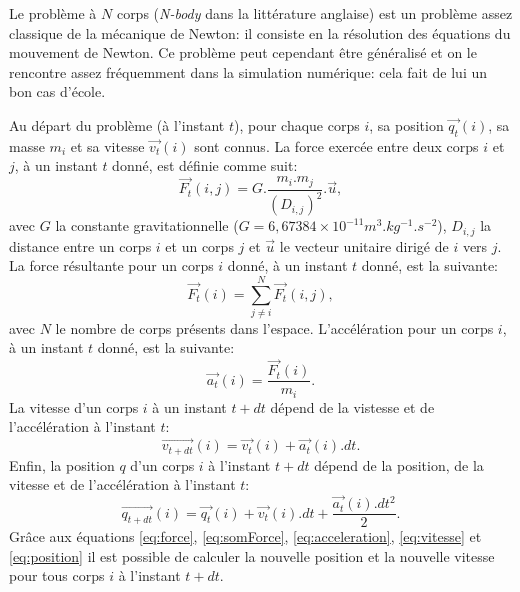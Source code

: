 Le problème à $N$ corps (\textit{N-body} dans la littérature anglaise) est un problème assez classique de la mécanique de {\sc Newton}: il consiste en la résolution des équations du mouvement de {\sc Newton}. 
Ce problème peut cependant être généralisé et on le rencontre assez fréquemment dans la simulation numérique: cela fait de lui un bon cas d'école.

Au départ du problème (à l'instant $t$), pour chaque corps $i$, sa position $\vec{q_t}(i)$, sa masse $m_i$ et sa vitesse $\vec{v_t}(i)$ sont connus.
La force exercée entre deux corps $i$ et $j$, à un instant $t$ donné, est définie comme suit:
\begin{equation}
\label{eq:force}
\vec{F_t}(i,j) = G.\frac{m_i.m_j}{(D_{i,j})^2}.\vec{u},
\end{equation}
avec $G$ la constante gravitationnelle ($G = 6,67384\times10^{-11} m^3.kg^{-1}.s^{-2}$), $D_{i,j}$ la distance entre un corps $i$ et un corps $j$ et $\vec{u}$ le vecteur unitaire dirigé de $i$ vers $j$.
La force résultante pour un corps $i$ donné, à un instant $t$ donné, est la suivante:
\begin{equation}
\label{eq:somForce}
\vec{F_t}(i) = \sum_{j \ne i}^{N} \vec{F_t}(i,j),
\end{equation}
avec $N$ le nombre de corps présents dans l'espace.
L'accélération pour un corps $i$, à un instant $t$ donné, est la suivante:
\begin{equation}
\label{eq:acceleration}
\vec{a_t}(i) = \frac{\vec{F_t}(i)}{m_i}.
\end{equation}
La vitesse d'un corps $i$ à un instant $t + dt$ dépend de la vistesse et de l'accélération à l'instant $t$:
\begin{equation}
\label{eq:vitesse}
\vec{v_{t+dt}}(i) = \vec{v_{t}}(i) + \vec{a_t}(i).dt.
\end{equation}
Enfin, la position $q$ d'un corps $i$ à l'instant $t + dt$ dépend de la position, de la vitesse et de l'accélération à l'instant $t$:
\begin{equation}
\label{eq:position}
\vec{q_{t+dt}}(i) = \vec{q_{t}}(i) + \vec{v_{t}}(i).dt + \frac{\vec{a_t}(i).dt^2}{2}.
\end{equation}
Grâce aux équations \ref{eq:force}, \ref{eq:somForce}, \ref{eq:acceleration}, \ref{eq:vitesse} et \ref{eq:position} il est possible de calculer la nouvelle position et la nouvelle vitesse pour tous corps $i$ à l'instant $t + dt$.

